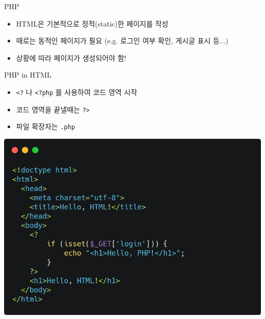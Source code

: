 \documentclass{beamer}
\begin{document}
    \begin{frame}{PHP}
        \begin{itemize}
            \item HTML은 기본적으로 정적(static)한 페이지를 작성
            \item 때로는 동적인 페이지가 필요 (e.g. 로그인 여부 확인, 게시글 표시 등...)
            \item 상황에 따라 페이지가 생성되어야 함!
        \end{itemize}
    \end{frame}

    \begin{frame}{PHP in HTML}
        \begin{itemize}
            \item \texttt{<?} 나 \texttt{<?php} 를 사용하여 코드 영역 시작
            \item 코드 영역을 끝낼때는 \texttt{?>}
            \item 파일 확장자는 \texttt{.php}
        \end{itemize}
        
        \begin{center}
            \includegraphics[height=0.5\textheight]{Images/html-php.png}
        \end{center}
    \end{frame}
\end{document}
